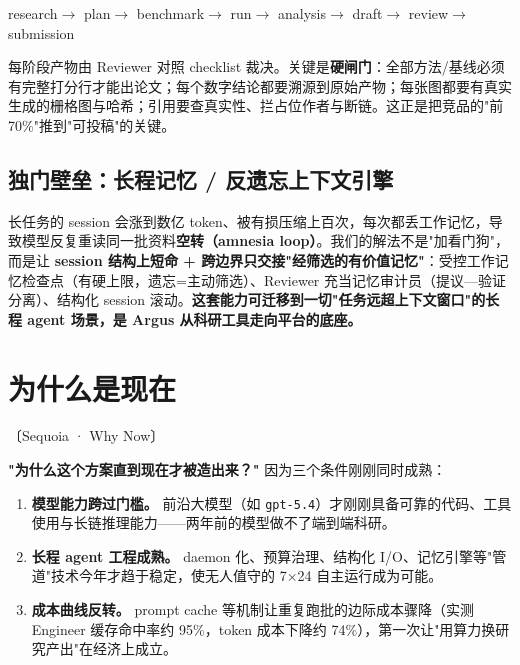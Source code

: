 \documentclass[UTF8,11pt,fontset=none]{ctexart}
\newcommand{\hl}[1]{\textbf{\color{argusnavy}#1}}
\newcommand{\sq}[1]{\hfill{\sffamily\footnotesize\color{argusgray}〔Sequoia · #1〕}}
\begin{document}
\begin{center}
\colorbox{argusteal}{\color{white}\sffamily\;research\;}$\rightarrow$
\colorbox{argusteal}{\color{white}\sffamily\;plan\;}$\rightarrow$
\colorbox{argusteal}{\color{white}\sffamily\;benchmark\;}$\rightarrow$
\colorbox{argusteal}{\color{white}\sffamily\;run\;}$\rightarrow$
\colorbox{argusteal}{\color{white}\sffamily\;analysis\;}$\rightarrow$
\colorbox{argusteal}{\color{white}\sffamily\;draft\;}$\rightarrow$
\colorbox{argusteal}{\color{white}\sffamily\;review\;}$\rightarrow$
\colorbox{argusnavy}{\color{white}\sffamily\;submission\;}
\end{center}

每阶段产物由 Reviewer 对照 checklist 裁决。关键是\textbf{硬闸门}：全部方法/基线必须有完整打分行才能出论文；每个数字结论都要溯源到原始产物；每张图都要有真实生成的栅格图与哈希；引用要查真实性、拦占位作者与断链。这正是把竞品的"前 70\%"推到"可投稿"的关键。

\subsection{独门壁垒：长程记忆 / 反遗忘上下文引擎}

长任务的 session 会涨到数亿 token、被有损压缩上百次，每次都丢工作记忆，导致模型反复重读同一批资料\textbf{空转（amnesia loop）}。我们的解法不是"加看门狗"，而是让 \textbf{session 结构上短命 + 跨边界只交接"经筛选的有价值记忆"}：受控工作记忆检查点（有硬上限，遗忘=主动筛选）、Reviewer 充当记忆审计员（提议—验证分离）、结构化 session 滚动。\textbf{这套能力可迁移到一切"任务远超上下文窗口"的长程 agent 场景，是 Argus 从科研工具走向平台的底座。}

\section{为什么是现在}\sq{Why Now}

\textbf{"为什么这个方案直到现在才被造出来？"} 因为三个条件刚刚同时成熟：

\begin{enumerate}
  \item \hl{模型能力跨过门槛。} 前沿大模型（如 \texttt{gpt-5.4}）才刚刚具备可靠的代码、工具使用与长链推理能力——两年前的模型做不了端到端科研。
  \item \hl{长程 agent 工程成熟。} daemon 化、预算治理、结构化 I/O、记忆引擎等"管道"技术今年才趋于稳定，使无人值守的 7×24 自主运行成为可能。
  \item \hl{成本曲线反转。} prompt cache 等机制让重复跑批的边际成本骤降（实测 Engineer 缓存命中率约 95\%，token 成本下降约 74\%），第一次让"用算力换研究产出"在经济上成立。
\end{enumerate}
\end{document}
